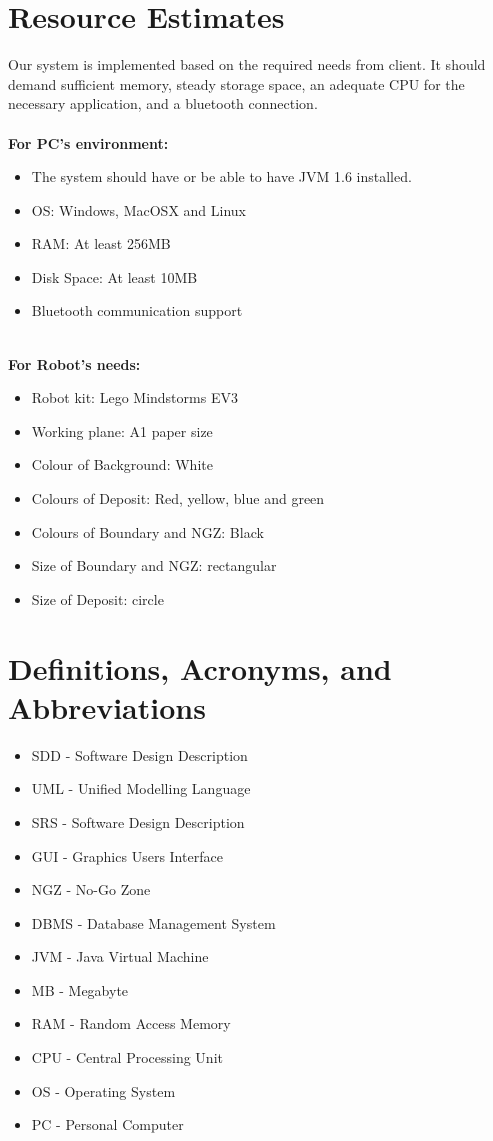\documentclass[11pt, a4paper]{article}
\begin{document}
\section{Resource Estimates}
Our system is implemented based on the required needs from client. It should demand sufficient memory, steady storage space, an adequate CPU for the necessary application, and a bluetooth connection.\\
\\
\textbf{For PC's environment:}
\begin{itemize}
\item {The system should have or be able to have JVM 1.6 installed. }
\item {OS: }Windows, MacOSX and Linux
\item {RAM: }At least 256MB
\item {Disk Space: } At least 10MB
\item {Bluetooth communication support}
\end{itemize}
\\
\textbf{For Robot's needs:}
\begin{itemize}
\item {Robot kit: }Lego Mindstorms EV3
\item {Working plane: }A1 paper size
\item {Colour of Background: }White
\item {Colours of Deposit: } Red, yellow, blue and green
\item {Colours of Boundary and NGZ: }Black
\item {Size of Boundary and NGZ: }rectangular
\item {Size of Deposit: }circle
\end{itemize}

\section{Definitions, Acronyms, and Abbreviations}
\begin{itemize}
\item { SDD - }Software Design Description
\item { UML - }Unified Modelling Language
\item { SRS - }Software Design Description
\item { GUI - }Graphics Users Interface
\item { NGZ - }No-Go Zone
\item { DBMS - }Database Management System
\item { JVM - }Java Virtual Machine
\item { MB - }Megabyte
\item { RAM - }Random Access Memory
\item { CPU - }Central Processing Unit
\item { OS - }Operating System
\item { PC - }Personal Computer
\end{itemize}
\end{document}
